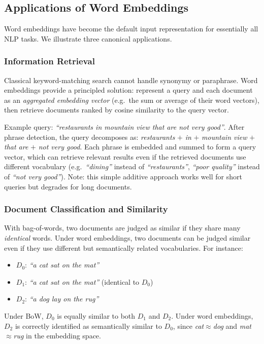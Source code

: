 \documentclass[11pt,a4paper]{article}
\begin{document}
\subsection{Applications of Word Embeddings}
\label{sec:we_applications}

Word embeddings have become the default input representation for essentially all NLP tasks. We illustrate three canonical applications.

\subsubsection{Information Retrieval}

Classical keyword-matching search cannot handle synonymy or paraphrase. Word embeddings provide a principled solution: represent a query and each document as an \emph{aggregated embedding vector} (e.g.\ the sum or average of their word vectors), then retrieve documents ranked by cosine similarity to the query vector.

Example query: \textit{``restaurants in mountain view that are not very good''}. After phrase detection, the query decomposes as: \textit{restaurants} $+$ \textit{in} $+$ \textit{mountain view} $+$ \textit{that are} $+$ \textit{not very good}. Each phrase is embedded and summed to form a query vector, which can retrieve relevant results even if the retrieved documents use different vocabulary (e.g.\ \textit{``dining''} instead of \textit{``restaurants''}, \textit{``poor quality''} instead of \textit{``not very good''}). Note: this simple additive approach works well for short queries but degrades for long documents.

\subsubsection{Document Classification and Similarity}

With bag-of-words, two documents are judged as similar if they share many \emph{identical} words. Under word embeddings, two documents can be judged similar even if they use different but semantically related vocabularies. For instance:
\begin{itemize}
  \item $D_0$: \textit{``a cat sat on the mat''}
  \item $D_1$: \textit{``a cat sat on the mat''} (identical to $D_0$)
  \item $D_2$: \textit{``a dog lay on the rug''}
\end{itemize}
Under BoW, $D_0$ is equally similar to both $D_1$ and $D_2$. Under word embeddings, $D_2$ is correctly identified as semantically similar to $D_0$, since \textit{cat}$\approx$\textit{dog} and \textit{mat}$\approx$\textit{rug} in the embedding space.
\end{document}
